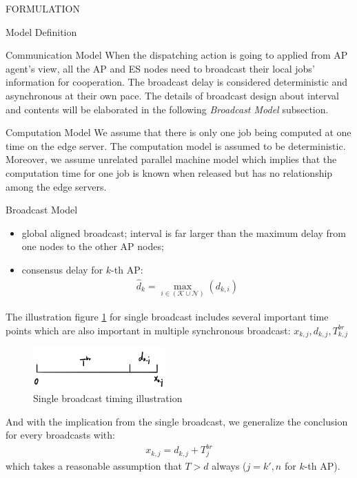 \documentclass[10pt, conference, letterpaper]{IEEEtran}
\begin{document}
\begin{section}{FORMULATION}
\begin{subsection}{Model Definition}
\begin{subsubsection}{Communication Model}
                When the dispatching action is going to applied from AP agent's view, all the AP and ES nodes need to broadcast their local jobs' information for cooperation. The broadcast delay is considered deterministic and asynchronous at their own pace.
                The details of broadcast design about interval and contents will be elaborated in the following \textit{Broadcast Model} subsection.
            \end{subsubsection}

            \begin{subsubsection}{Computation Model}
                We assume that there is only one job being computed at one time on the edge server. The computation model is assumed to be deterministic.
                Moreover, we assume unrelated parallel machine model which implies that the computation time for one job is known when released but has no relationship among the edge servers.
            \end{subsubsection}

            \begin{subsubsection}{Broadcast Model}
                \begin{itemize}
                    \item global aligned broadcast; interval is far larger than the maximum delay from one nodes to the other AP nodes;
                    \item consensus delay for $k$-th AP:
                        \begin{align}
                            \hat{d}_k = \max_{i\in(\mathcal{K} \cup \mathcal{N})}(d_{k,i})
                        \end{align}
                \end{itemize}

                The illustration figure \ref{fig:brd} for single broadcast includes several important time points which are also important in multiple synchronous broadcast: $x_{k,j}, d_{k,j}, T^{br}_{k,j}$
                \begin{figure}[h]
                    \centering
                    \includegraphics[width=0.45\textwidth]{single-broadcast.png}
                    \caption{Single broadcast timing illustration}
                    \label{fig:brd}
                \end{figure}
                And with the implication from the single broadcast, we generalize the conclusion for every broadcasts with:
                \begin{align}
                    x_{k,j} = d_{k,j} + T^{br}_{j}
                \end{align}
                which takes a reasonable assumption that $T>d$ always ($j=k',n$ for $k$-th AP).
            \end{subsubsection}
        \end{subsection}


\end{section}
\end{document}
